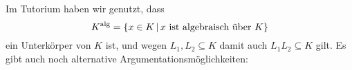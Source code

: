 \section{}





\addtocounter{subsection}{1}





\subsection{}

Im Tutorium haben wir genutzt, dass
\[
    K^\alg
  = \{ 
      x \in K
      \suchthat
      \text{$x$ ist algebraisch über $K$}
    \}
\]
ein Unterkörper von $K$ ist, und wegen $L_1, L_2 \subseteq K$ damit auch $L_1 L_2 \subseteq K$ gilt.
Es gibt auch noch alternative Argumentationsmöglichkeiten:

